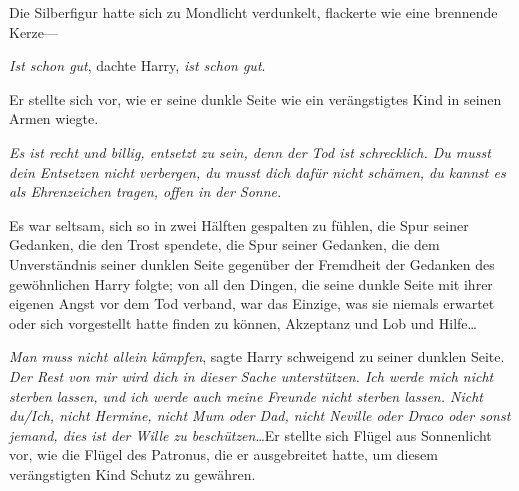 Die Silberfigur hatte sich zu Mondlicht verdunkelt, flackerte wie eine brennende Kerze—

\emph{Ist schon gut}, dachte Harry, \emph{ist schon gut}.

Er stellte sich vor, wie er seine dunkle Seite wie ein verängstigtes Kind in seinen Armen wiegte.

\emph{Es ist recht und billig, entsetzt zu sein, denn der Tod ist schrecklich. Du musst dein Entsetzen nicht verbergen, du musst dich dafür nicht schämen, du kannst es als Ehrenzeichen tragen, offen in der Sonne.}

Es war seltsam, sich so in zwei Hälften gespalten zu fühlen, die Spur seiner Gedanken, die den Trost spendete, die Spur seiner Gedanken, die dem Unverständnis seiner dunklen Seite gegenüber der Fremdheit der Gedanken des gewöhnlichen Harry folgte; von all den Dingen, die seine dunkle Seite mit ihrer eigenen Angst vor dem Tod verband, war das Einzige, was sie niemals erwartet oder sich vorgestellt hatte finden zu können, Akzeptanz und Lob und Hilfe…

\emph{Man muss nicht allein kämpfen}, sagte Harry schweigend zu seiner dunklen Seite. \emph{Der Rest von mir wird dich in dieser Sache unterstützen. Ich werde mich nicht sterben lassen, und ich werde auch meine Freunde nicht sterben lassen. Nicht du/Ich, nicht Hermine, nicht Mum oder Dad, nicht Neville oder Draco oder sonst jemand, dies ist der Wille zu beschützen}…Er stellte sich Flügel aus Sonnenlicht vor, wie die Flügel des Patronus, die er ausgebreitet hatte, um diesem verängstigten Kind Schutz zu gewähren.

